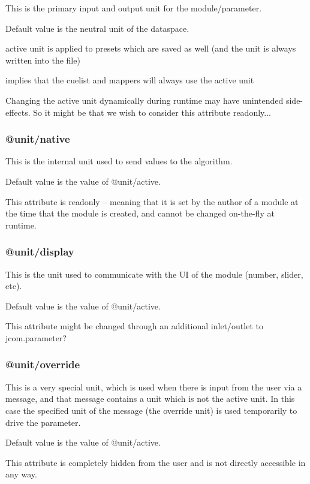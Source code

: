 \documentclass[]{article}
\begin{document}
This is the primary input and output unit for the module/parameter.

Default value is the neutral unit of the dataspace.

active unit is applied to presets which are saved as well 
  (and the unit is always written into the file)

implies that the cuelist and mappers will always use the active unit

Changing the active unit dynamically during runtime may have unintended side-effects.  So it might be that we wish to consider this attribute readonly...


\subsubsection{@unit/native}

This is the internal unit used to send values to the algorithm.

Default value is the value of @unit/active.

This attribute is readonly -- meaning that it is set by the author of a module at the time that the module is created, and cannot be changed on-the-fly at runtime.


\subsubsection{@unit/display}

This is the unit used to communicate with the UI of the module (number, slider, etc).

Default value is the value of @unit/active.

This attribute might be changed through an additional inlet/outlet to jcom.parameter?


\subsubsection{@unit/override}

This is a very special unit, which is used when there is input from the user via a message, and that message contains a unit which is not the active unit.  In this case the specified unit of the message (the override unit) is used temporarily to drive the parameter.

Default value is the value of @unit/active.

This attribute is completely hidden from the user and is not directly accessible in any way.
\end{document}
